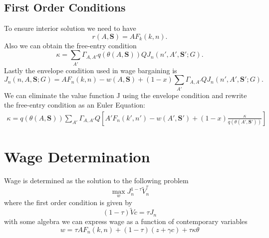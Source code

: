 \documentclass[12pt]{article}
\begin{document}
	
\subsection{First Order Conditions}
To ensure interior solution we need to have
	\[
	r(A,\mathbf{S}) = AF_{k}(k,n).
	\]
Also we can obtain the free-entry condition
	\[
	\kappa = \sum_{A'} \Gamma_{A,A'} q(\theta(A,\mathbf{S}))QJ_{n}(n',A',\mathbf{S'};G).
	\]
Lastly the envelope condition used in wage bargaining is
	\[
	J_{n}(n,A,\mathbf{S};G) =  AF_{n}(k,n) - w(A,\mathbf{S}) + (1-x)\sum_{A'} \Gamma_{A,A'} QJ_{n}(n',A',\mathbf{S'};G).
	\]
We can eliminate the value function J using the envelope condition and rewrite the free-entry condition as an Euler Equation:
	\begin{eqnarray}
	\kappa = q(\theta(A,\mathbf{S})) \sum_{A'} \Gamma_{A,A'} Q \left[ A'F_{n}(k',n')-w(A',\mathbf{S'})+(1-x)\frac{\kappa}{q(\theta(A',\mathbf{S'}))}\right]
	\end{eqnarray}

\section{Wage Determination}
Wage is determined as the solution to the following problem
	\[
	\max_{w} J_{n}^{1-\tau}\tilde{V}_{n}^{\tau}
	\]
	where the first order condition is given by
	\[
	(1-\tau)\tilde{V}c = \tau J_{n}
	\]
	with some algebra we can express wage as a function of contemporary variables
	\begin{equation}
	w = \tau A F_{n}(k,n) + (1-\tau)(z+\gamma c) + \tau \kappa \theta \label{eqn:wage}
	\end{equation}
	
\end{document}
